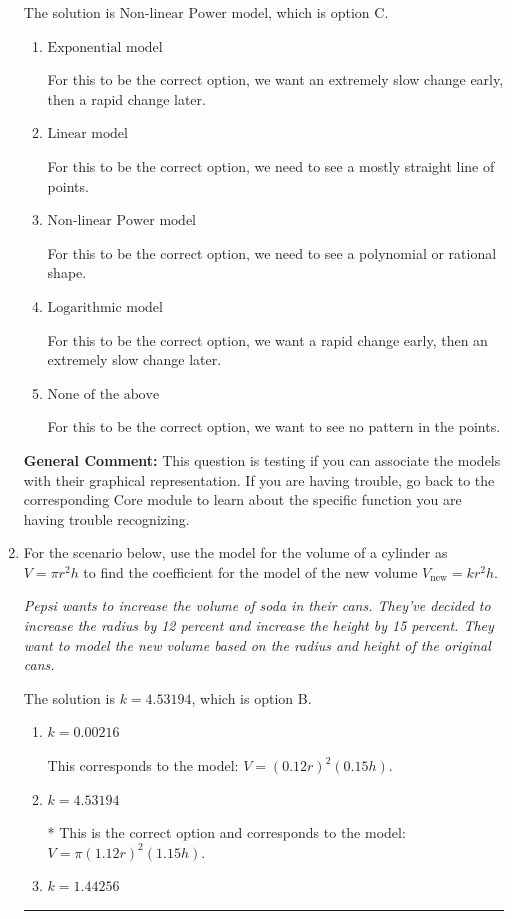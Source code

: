 \documentclass{extbook}[14pt]
\newcommand{\litem}[1]{\item #1

\rule{\textwidth}{0.4pt}}
\begin{document}
\begin{enumerate}
{The solution is \( \text{Non-linear Power model} \), which is option C.\begin{enumerate}[label=\Alph*.]
\item \( \text{Exponential model} \)

For this to be the correct option, we want an extremely slow change early, then a rapid change later.
\item \( \text{Linear model} \)

For this to be the correct option, we need to see a mostly straight line of points.
\item \( \text{Non-linear Power model} \)

For this to be the correct option, we need to see a polynomial or rational shape.
\item \( \text{Logarithmic model} \)

For this to be the correct option, we want a rapid change early, then an extremely slow change later.
\item \( \text{None of the above} \)

For this to be the correct option, we want to see no pattern in the points.
\end{enumerate}

\textbf{General Comment:} This question is testing if you can associate the models with their graphical representation. If you are having trouble, go back to the corresponding Core module to learn about the specific function you are having trouble recognizing.
}
\litem{
For the scenario below, use the model for the volume of a cylinder as $V = \pi r^2 h$ to find the coefficient for the model of the new volume $V_{\text{new}} = k r^2 h$.

\begin{center}
    \textit{ Pepsi wants to increase the volume of soda in their cans. They've decided to increase the radius by 12 percent and increase the height by 15 percent. They want to model the new volume based on the radius and height of the original cans. }
\end{center}
The solution is \( k = 4.53194 \), which is option B.\begin{enumerate}[label=\Alph*.]
\item \( k = 0.00216 \)

This corresponds to the model: $V = (0.12 r)^2 (0.15 h)$.
\item \( k = 4.53194 \)

* This is the correct option and corresponds to the model: $V = \pi (1.12 r)^2 (1.15 h)$.
\item \( k = 1.44256 \)


\end{enumerate}}
\end{enumerate}
\end{document}
